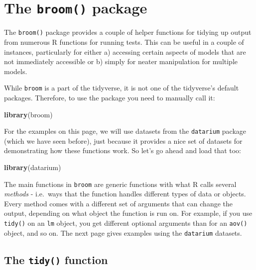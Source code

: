 \documentclass[
]{book}
\newenvironment{Shaded}{\begin{snugshade}}{\end{snugshade}}
\newcommand{\FunctionTok}[1]{\textcolor[rgb]{0.13,0.29,0.53}{\textbf{#1}}}
\newcommand{\NormalTok}[1]{#1}
\begin{document}
\chapter{\texorpdfstring{The \texttt{broom()} package}{The broom() package}}\label{broom}

The \texttt{broom()} package provides a couple of helper functions for tidying up output from numerous R functions for running tests. This can be useful in a couple of instances, particularly for either a) accessing certain aspects of models that are not immediately accessible or b) simply for neater manipulation for multiple models.

While \texttt{broom} is a part of the tidyverse, it is not one of the tidyverse's default packages. Therefore, to use the package you need to manually call it:

\begin{Shaded}
\begin{Highlighting}[]
\FunctionTok{library}\NormalTok{(broom)}
\end{Highlighting}
\end{Shaded}

For the examples on this page, we will use datasets from the \texttt{datarium} package (which we have seen before), just because it provides a nice set of datasets for demonstrating how these functions work. So let's go ahead and load that too:

\begin{Shaded}
\begin{Highlighting}[]
\FunctionTok{library}\NormalTok{(datarium)}
\end{Highlighting}
\end{Shaded}

The main functions in \texttt{broom} are generic functions with what R calls several \emph{methods} - i.e.~ways that the function handles different types of data or objects. Every method comes with a different set of arguments that can change the output, depending on what object the function is run on. For example, if you use \texttt{tidy()} on an \texttt{lm} object, you get different optional arguments than for an \texttt{aov()} object, and so on. The next page gives examples using the \texttt{datarium} datasets.

\section{\texorpdfstring{The \texttt{tidy()} function}{The tidy() function}}\label{broom-tidy}
\end{document}
